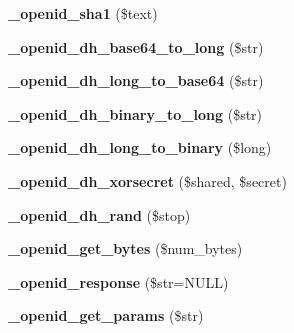 \begin{CompactItemize}
\item 
\hypertarget{openid_8inc_3387da37f1b4f89bf95c56b1f8270d53}{
\textbf{\_\-openid\_\-sha1} (\$text)}
\label{openid_8inc_3387da37f1b4f89bf95c56b1f8270d53}

\item 
\hypertarget{openid_8inc_dd8eead4c4954c3ad50ff4990f165478}{
\textbf{\_\-openid\_\-dh\_\-base64\_\-to\_\-long} (\$str)}
\label{openid_8inc_dd8eead4c4954c3ad50ff4990f165478}

\item 
\hypertarget{openid_8inc_796f1e583d3276d8e8032fa5a4c0f616}{
\textbf{\_\-openid\_\-dh\_\-long\_\-to\_\-base64} (\$str)}
\label{openid_8inc_796f1e583d3276d8e8032fa5a4c0f616}

\item 
\hypertarget{openid_8inc_422c58798b7986b43a2b565df1b9f2d7}{
\textbf{\_\-openid\_\-dh\_\-binary\_\-to\_\-long} (\$str)}
\label{openid_8inc_422c58798b7986b43a2b565df1b9f2d7}

\item 
\hypertarget{openid_8inc_9d1a28ec06188bbbc85acf1bfc41ae1d}{
\textbf{\_\-openid\_\-dh\_\-long\_\-to\_\-binary} (\$long)}
\label{openid_8inc_9d1a28ec06188bbbc85acf1bfc41ae1d}

\item 
\hypertarget{openid_8inc_f0f8bf2c50cbe825681e7e319a1fd33f}{
\textbf{\_\-openid\_\-dh\_\-xorsecret} (\$shared, \$secret)}
\label{openid_8inc_f0f8bf2c50cbe825681e7e319a1fd33f}

\item 
\hypertarget{openid_8inc_58900a927921ff4c61f925b81ceabbc0}{
\textbf{\_\-openid\_\-dh\_\-rand} (\$stop)}
\label{openid_8inc_58900a927921ff4c61f925b81ceabbc0}

\item 
\hypertarget{openid_8inc_d13ffee2af6f25a64082b7e2c3cfe39f}{
\textbf{\_\-openid\_\-get\_\-bytes} (\$num\_\-bytes)}
\label{openid_8inc_d13ffee2af6f25a64082b7e2c3cfe39f}

\item 
\hypertarget{openid_8inc_56f4846ea99195ce405d7b9704b424b0}{
\textbf{\_\-openid\_\-response} (\$str=NULL)}
\label{openid_8inc_56f4846ea99195ce405d7b9704b424b0}

\item 
\hypertarget{openid_8inc_e62ec8d61534cb5aa5a4a8f0d01b5dee}{
\textbf{\_\-openid\_\-get\_\-params} (\$str)}
\label{openid_8inc_e62ec8d61534cb5aa5a4a8f0d01b5dee}

\end{CompactItemize}



